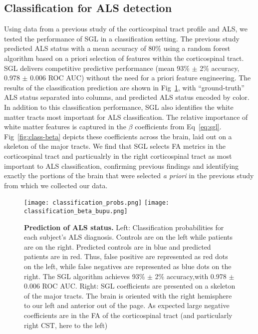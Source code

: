 \subsection*{Classification for ALS detection}

Using data from a previous study of the corticospinal tract profile and
ALS\cite{sarica2017corticospinal}, we tested the performance of SGL in a
classification setting. The previous study predicted ALS status with a mean
accuracy of 80\% using a random forest algorithm based on a priori selection of
features within the corticospinal tract. SGL delivers competitive predictive
performance (mean 93\% $\pm$ 2\% accuracy, 0.978 $\pm$ 0.006 ROC AUC) without
the need for a priori feature engineering. The results of the classification
prediction are shown in Fig~\ref{fig:class-results}, with ``ground-truth'' ALS
status separated into columns, and predicted ALS status encoded by color. In
addition to this classification performance, SGL also identifies the white
matter tracts most important for ALS classification. The relative importance of
white matter features is captured in the $\beta$ coefficients from
Eq~\eqref{eq:sgl}. Fig~\ref{fig:class-beta} depicts these coefficients across
the brain, laid out on a skeleton of the major tracts. We find that SGL selects
FA metrics in the corticospinal tract and particualrly in the right
corticospinal tract as most important to ALS classification, confirming previous
findings\cite{van2011upper, toosy2003diffusion, sarica2014tractography,
sage2007quantitative, sage2009quantitative, karlsborg2004corticospinal,
ellis1999diffusion, cosottini2005diffusion, ciccarelli2009investigation,
abe2010voxel} and identifying exactly the portions of the brain that were
selected \emph{a priori} in the previous study from which we collected our
data\cite{sarica2017corticospinal}.

\begin{figure}[!h]
    \centering
    \texttt{[image: classification\_probs.png]}
    \texttt{[image: classification\_beta\_bupu.png]}

    \caption{{\bf Prediction of ALS status.}
        Left: Classification probabilities for each subject's ALS diagnosis.
        Controls are on the left while patients are on the right. Predicted
        controls are in blue and predicted patients are in red. Thus, false
        positive are represented as red dots on the left, while false negatives
        are represented as blue dots on the right. The SGL algorithm achieves
        93\% $\pm$ 2\% accuracy,with 0.978 $\pm$ 0.006 ROC AUC. Right: SGL
        coefficients are presented on a skeleton of the major tracts. The brain
        is oriented with the right hemisphere to our left and anterior out of
        the page. As expected large negative coefficients are in the FA of the
        corticospinal tract (and particularly right CST, here to the left)}
    \label{fig:class-results}
\end{figure}


